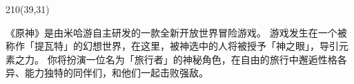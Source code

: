 \pagestyle{empty}


\begin{textblock}{210}(39,31)
    \bfseries
    \makebox[28em][l]{\stutitle}
\end{textblock}

\begin{requirementtext}
    \par 《原神》是由米哈游自主研发的一款全新开放世界冒险游戏。
    游戏发生在一个被称作「提瓦特」的幻想世界，在这里，被神选中的人将被授予「神之眼」，导引元素之力。
    你将扮演一位名为「旅行者」的神秘角色，在自由的旅行中邂逅性格各异、能力独特的同伴们，和他们一起击败强敌。
\end{requirementtext}

\null\clearpage